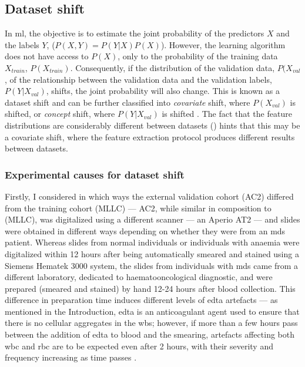 \begin{figure}[!ht]
    \label{fig:u-map}
\end{figure}

\subsection{Dataset shift} 

In \ac{ml}, the objective is to estimate the joint probability of the predictors $X$ and the labels $Y$, ($P(X,Y)=P(Y|X)P(X)$). However, the learning algorithm does not have access to $P(X)$, only to the probability of the training data $X_{train}$, $P(X_{train})$. Consequently, if the distribution of the validation data, $P(X_{val}$, of the relationship between the validation data and the validation labels, $P(Y|X_{val})$, shifts, the joint probability will also change. This is known as a dataset shift and can be further classified into \textit{covariate} shift, where $P(X_{val})$ is shifted, or \textit{concept} shift, where $P(Y|X_{val})$ is shifted \cite{Y2019-vc}. The fact that the feature distributions are considerably different between datasets () hints that this may be a covariate shift, where the feature extraction protocol produces different results between datasets.

\subsubsection{Experimental causes for dataset shift} 

Firstly, I considered in which ways the external validation cohort (AC2) differed from the training cohort (MLLC) --- AC2, while similar in composition to (MLLC), was digitalized using a different scanner --- an Aperio AT2 --- and slides were obtained in different ways depending on whether they were from an \ac{mds} patient. Whereas slides from normal individuals or individuals with anaemia were digitalized within 12 hours after being automatically smeared and stained using a Siemens Hematek 3000 system, the slides from individuals with \ac{mds} came from a different laboratory, dedicated to haematooncological diagnostic, and were prepared (smeared and stained) by hand 12-24 hours after blood collection. This difference in preparation time induces different levels of \ac{edta} artefacts --- as mentioned in the Introduction, \ac{edta} is an anticoagulant agent used to ensure that there is no cellular aggregates in the \ac{wbs}; however, if more than a few hours pass between the addition of \ac{edta} to blood and the smearing, artefacts affecting both \ac{wbc} and \ac{rbc} are to be expected even after 2 hours, with their severity and frequency increasing as time passes \cite{Bain2005-zg,Narasimha2008-fh}.

